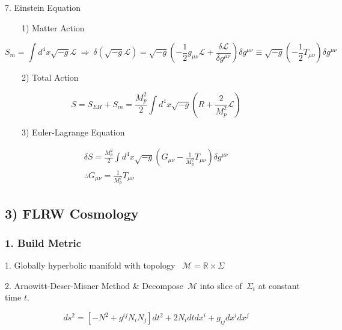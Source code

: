 \documentclass[10pt]{article}
\begin{document}
7. Einstein Equation

~~~~1) Matter Action

\begin{equation}
S_m = \int d^4x\sqrt{-g}\mathcal{L} ~\Rightarrow~ \delta(\sqrt{-g}\mathcal{L}) = \sqrt{-g}\left(-\frac{1}{2}g_{\mu\nu}\mathcal{L} + \frac{\delta\mathcal{L}}{\delta g^{\mu\nu}}\right) \delta g^{\mu\nu}\equiv \sqrt{-g}(-\frac{1}{2}T_{\mu\nu})\delta g^{\mu\nu}
\end{equation}

~~~~2) Total Action

\begin{equation}
S = S_{EH} + S_m = \frac{M_p^2}{2}\int d^4x\sqrt{-g}\left(R + \frac{2}{M_p^2}\mathcal{L}\right)
\end{equation}

~~~~3) Euler-Lagrange Equation

\begin{equation}
\begin{gathered}
\delta S = \frac{M_p^2}{2}\int d^4x \sqrt{-g} \left(G_{\mu\nu} - \frac{1}{M_p^2}T_{\mu\nu}\right)\delta g^{\mu\nu} \\
\therefore G_{\mu\nu} = \frac{1}{M_p^2}T_{\mu\nu}
\end{gathered}
\end{equation}

\subsection*{3) FLRW Cosmology}

{\label{753948}}

\subsubsection*{}

{\label{729502}}

\subsubsection*{1. Build Metric}

{\label{339188}}\par\null

1. Globally hyperbolic manifold with topology~ \(\mathcal{M} = \mathbb{R}\times\Sigma\)

2. Arnowitt-Deser-Misner Method \& Decompose~\(\mathcal{M}\) into
slice of~\(\Sigma_t\) at constant time \(t\).

\begin{equation}
ds^2 = \left[-N^2 + g^{ij}N_iN_j \right]dt^2 + 2N_i dt dx^i + g_{ij}dx^idx^j
\end{equation}
\end{document}

